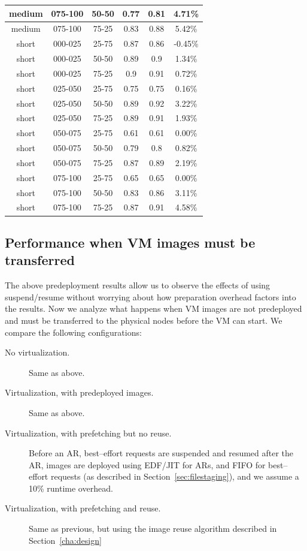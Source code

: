 \begin{table}
\begin{center}
\begin{tabular}{|c|c|c|c|c|c|}
medium & 075-100 & 50-50 & 0.77 & 0.81 & 4.71\%
\\\hline
medium & 075-100 & 75-25 & 0.83 & 0.88 & 5.42\%
\\\hline
short & 000-025 & 25-75 & 0.87 & 0.86 & -0.45\%
\\\hline
short & 000-025 & 50-50 & 0.89 & 0.9 & 1.34\%
\\\hline
short & 000-025 & 75-25 & 0.9 & 0.91 & 0.72\%
\\\hline
short & 025-050 & 25-75 & 0.75 & 0.75 & 0.16\%
\\\hline
short & 025-050 & 50-50 & 0.89 & 0.92 & 3.22\%
\\\hline
short & 025-050 & 75-25 & 0.89 & 0.91 & 1.93\%
\\\hline
short & 050-075 & 25-75 & 0.61 & 0.61 & 0.00\%
\\\hline
short & 050-075 & 50-50 & 0.79 & 0.8 & 0.82\%
\\\hline
short & 050-075 & 75-25 & 0.87 & 0.89 & 2.19\%
\\\hline
short & 075-100 & 25-75 & 0.65 & 0.65 & 0.00\%
\\\hline
short & 075-100 & 50-50 & 0.83 & 0.86 & 3.11\%
\\\hline
short & 075-100 & 75-25 & 0.87 & 0.91 & 4.58\%
\\\hline
\end{tabular}
\label{tab:noVMvsPredeployUtil}
\end{center}
\end{table}

\subsection{Performance when VM images must be transferred}

The above predeployment results allow us to observe the effects of using suspend/resume without worrying about how preparation overhead factors into the results. Now we analyze what happens when VM images are not predeployed and must be transferred to the physical nodes before the VM can start. We compare the following configurations:

\begin{description}
\item[No virtualization.] Same as above.
\item[Virtualization, with predeployed images.] Same as above.
\item[Virtualization, with prefetching but no reuse.] Before an AR, best--effort requests are suspended and resumed after the AR, images are deployed using EDF/JIT for ARs, and FIFO for best--effort requests (as described in Section~\ref{sec:filestaging}), and we assume a 10\% runtime overhead.
\item[Virtualization, with prefetching and reuse.] Same as previous, but using the image reuse algorithm described in Section~\ref{cha:design}
\end{description}

